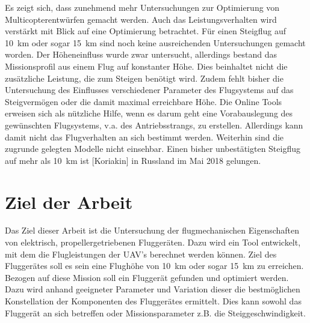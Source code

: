 Es zeigt sich, dass zunehmend mehr Untersuchungen zur Optimierung von Multicopterentwürfen gemacht werden. Auch das Leistungsverhalten wird verstärkt mit Blick auf eine Optimierung betrachtet. Für einen Steigflug auf \SI{10}{km} oder sogar \SI{15}{km} sind noch keine ausreichenden Untersuchungen gemacht worden. Der Höheneinfluss wurde zwar untersucht, allerdings bestand das Missionsprofil aus einem Flug auf konstanter Höhe. Dies beinhaltet nicht die zusätzliche Leistung, die zum Steigen benötigt wird. Zudem fehlt bisher die Untersuchung des Einflusses verschiedener Parameter des Flugsystems auf das Steigvermögen oder die damit maximal erreichbare Höhe. Die Online Tools erweisen sich als nützliche Hilfe, wenn es darum geht eine Vorabauslegung des gewünschten Flugsystems, v.a. des Antriebsstrangs, zu erstellen. Allerdings kann damit nicht das Flugverhalten an sich bestimmt werden. Weiterhin sind die zugrunde gelegten Modelle nicht einsehbar. Einen bisher unbestätigten Steigflug auf mehr als \SI{10}{km} ist [Koriakin] in Russland im Mai 2018 gelungen. 



\section{Ziel der Arbeit}
\label{sec:ziel_der_atrbeit}
Das Ziel dieser Arbeit ist die Untersuchung der flugmechanischen Eigenschaften von elektrisch, propellergetriebenen Fluggeräten. Dazu wird ein Tool entwickelt, mit dem die Flugleistungen der UAV's berechnet werden können. Ziel des Fluggerätes soll es sein eine Flughöhe von \SI{10}{km} oder sogar \SI{15}{km} zu erreichen. Bezogen auf diese Mission soll ein Fluggerät gefunden und optimiert werden. Dazu wird anhand geeigneter Parameter und Variation dieser die bestmöglichen Konstellation der Komponenten des Fluggerätes ermittelt. Dies kann sowohl das Fluggerät an sich betreffen oder Missionsparameter z.B. die Steiggeschwindigkeit.

